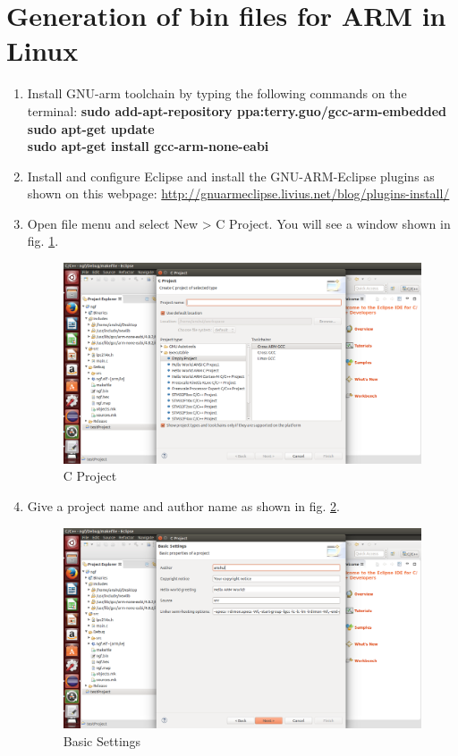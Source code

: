 \documentclass[20pt]{report}
\begin{document}
\section{Generation of bin files for ARM in Linux}
\begin{enumerate}
\item Install GNU-arm toolchain by typing the following commands on the terminal:
\newline
\textbf{sudo add-apt-repository ppa:terry.guo/gcc-arm-embedded\\sudo apt-get update\\sudo apt-get install gcc-arm-none-eabi}
\item Install and configure Eclipse and install the GNU-ARM-Eclipse plugins as shown on this webpage:
\newline
\url{http://gnuarmeclipse.livius.net/blog/plugins-install/}
\item Open file menu and select New > C Project. You will see a window shown in fig. \ref{ecl1}.
\begin{figure}[!h]
\centering
\includegraphics[width=0.7\linewidth]{ecl1}
\caption{C Project}
\label{ecl1}
\end{figure}
\item Give a project name and author name as shown in fig. \ref{ecl2}.
\begin{figure}[!h]
\centering
\includegraphics[width=0.7\linewidth]{ecl2}
\caption{Basic Settings}
\label{ecl2}
\end{figure}

\end{enumerate}
\end{document}
